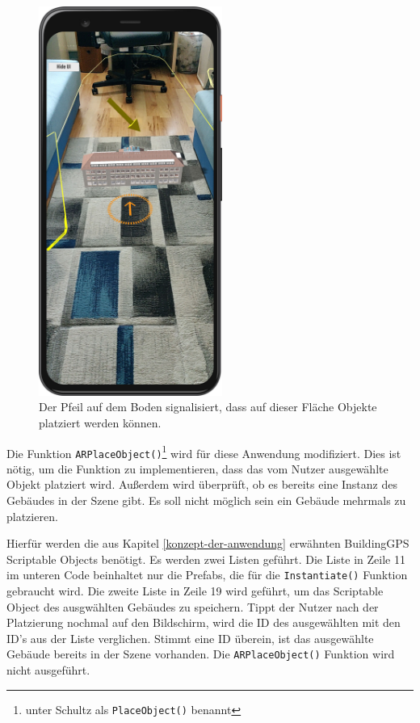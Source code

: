 \begin{figure}[H]
    \centering
    \includegraphics[width=6cm]{img/anwendung/technisch/controller/placement-indicator-beispiel.jpg}
    \caption{Der Pfeil auf dem Boden signalisiert, dass auf dieser Fläche Objekte platziert werden können.}
    \label{fig:anwendung-umsetzung-platzierung}
\end{figure}

Die Funktion \texttt{ARPlaceObject()}\footnote{unter Schultz als \texttt{PlaceObject()} benannt} wird für diese Anwendung modifiziert. Dies ist nötig, um die Funktion zu implementieren, dass das vom Nutzer ausgewählte Objekt platziert wird. Außerdem wird überprüft, ob es bereits eine Instanz des Gebäudes in der Szene gibt. Es soll nicht möglich sein ein Gebäude mehrmals zu platzieren.

Hierfür werden die aus Kapitel \ref*{konzept-der-anwendung} erwähnten BuildingGPS Scriptable Objects benötigt. Es werden zwei Listen geführt. Die Liste in Zeile 11 im unteren Code beinhaltet nur die Prefabs, die für die \texttt{Instantiate()} Funktion gebraucht wird. Die zweite Liste in Zeile 19 wird geführt, um das Scriptable Object des ausgwählten Gebäudes zu speichern. Tippt der Nutzer nach der Platzierung nochmal auf den Bildschirm, wird die ID des ausgewählten mit den ID's aus der Liste verglichen. Stimmt eine ID überein, ist das ausgewählte Gebäude bereits in der Szene vorhanden. Die \texttt{ARPlaceObject()} Funktion wird nicht ausgeführt.

